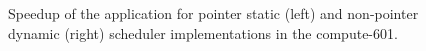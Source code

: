 \begin{figure}[!htp]
	\begin{center}
		\caption{Speedup of the \tth application for pointer static (left) and non-pointer dynamic (right) scheduler implementations in the compute-601.}
		\label{fig:Speedup601}
	\end{center}
\end{figure}

